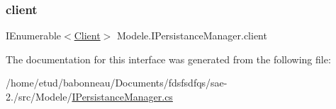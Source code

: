 \subsubsection{\texorpdfstring{client}{client}}
{\footnotesize\ttfamily I\+Enumerable$<$\hyperlink{classModele_1_1Client}{Client}$>$ Modele.\+I\+Persistance\+Manager.\+client}



The documentation for this interface was generated from the following file\+:\begin{DoxyCompactItemize}
\item 
/home/etud/babonneau/\+Documents/fdsfsdfqs/sae-\/2./src/\+Modele/\hyperlink{IPersistanceManager_8cs}{I\+Persistance\+Manager.\+cs}\end{DoxyCompactItemize}
